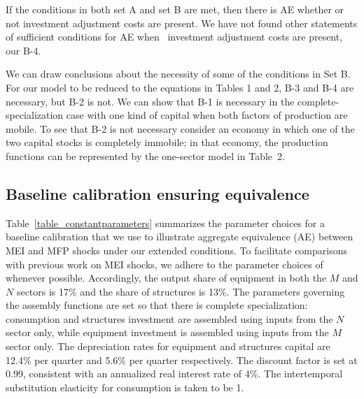 \documentclass[12pt,fleqn]{article}
\begin{document}
If the conditions in both set A and set B are met, then there is AE whether
or not investment adjustment costs are present. We have not found other statements of sufficient
conditions for AE when \ investment adjustment costs are present, our B-4.

We can draw conclusions about the necessity of some of the conditions in Set
B. For our model to be reduced to the equations in Tables 1 and 2, B-3 and B-4 are
necessary, but B-2 is not. We can show that B-1 is necessary  in the
complete-specialization case with one kind of capital when both factors of
production are mobile. To see that B-2 is not necessary consider an economy
in which one of the two capital stocks is completely immobile; in that
economy, the production functions can be represented by the one-sector model
in Table~2.

\subsection{\protect\normalsize Baseline calibration ensuring equivalence}

Table~\ref{table_constantparameters} summarizes the parameter
choices for a baseline calibration that we use to illustrate aggregate
equivalence (AE) between MEI and MFP shocks under our extended conditions.
To facilitate comparisons with previous work on MEI shocks, we adhere to the
parameter choices of  whenever possible.
Accordingly, the output share of equipment in both the $M$ and $N$ sectors
is 17\% and the share of structures is 13\%. The parameters governing the
assembly functions are set so that there is complete specialization:
consumption and structures investment are assembled using inputs from the $N$
sector only, while equipment investment is assembled using inputs from the $%
M $ sector only. The depreciation rates for equipment and
structures capital are 12.4\% per quarter and 5.6\% per quarter
respectively. The discount factor is set at 0.99, consistent with an
annualized real interest rate of 4\%. The intertemporal substitution
elasticity for consumption is taken to be 1.
\end{document}
